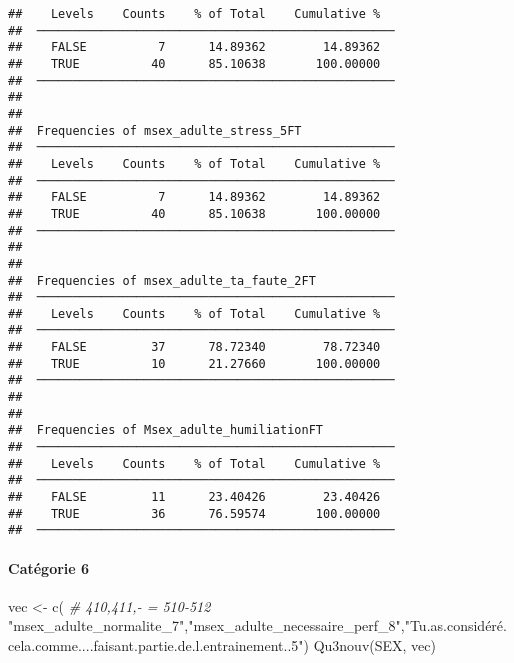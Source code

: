 \documentclass[
]{article}
\newenvironment{Shaded}{\begin{snugshade}}{\end{snugshade}}
\newcommand{\CommentTok}[1]{\textcolor[rgb]{0.56,0.35,0.01}{\textit{#1}}}
\newcommand{\FunctionTok}[1]{\textcolor[rgb]{0.00,0.00,0.00}{#1}}
\newcommand{\NormalTok}[1]{#1}
\newcommand{\OtherTok}[1]{\textcolor[rgb]{0.56,0.35,0.01}{#1}}
\newcommand{\StringTok}[1]{\textcolor[rgb]{0.31,0.60,0.02}{#1}}
\begin{document}
\begin{verbatim}
##    Levels    Counts    % of Total    Cumulative %   
##  ────────────────────────────────────────────────── 
##    FALSE          7      14.89362        14.89362   
##    TRUE          40      85.10638       100.00000   
##  ────────────────────────────────────────────────── 
## 
## 
##  Frequencies of msex_adulte_stress_5FT              
##  ────────────────────────────────────────────────── 
##    Levels    Counts    % of Total    Cumulative %   
##  ────────────────────────────────────────────────── 
##    FALSE          7      14.89362        14.89362   
##    TRUE          40      85.10638       100.00000   
##  ────────────────────────────────────────────────── 
## 
## 
##  Frequencies of msex_adulte_ta_faute_2FT            
##  ────────────────────────────────────────────────── 
##    Levels    Counts    % of Total    Cumulative %   
##  ────────────────────────────────────────────────── 
##    FALSE         37      78.72340        78.72340   
##    TRUE          10      21.27660       100.00000   
##  ────────────────────────────────────────────────── 
## 
## 
##  Frequencies of Msex_adulte_humiliationFT           
##  ────────────────────────────────────────────────── 
##    Levels    Counts    % of Total    Cumulative %   
##  ────────────────────────────────────────────────── 
##    FALSE         11      23.40426        23.40426   
##    TRUE          36      76.59574       100.00000   
##  ──────────────────────────────────────────────────
\end{verbatim}

\hypertarget{catuxe9gorie-6-1}{%
\paragraph{Catégorie 6}\label{catuxe9gorie-6-1}}

\begin{Shaded}
\begin{Highlighting}[]
\NormalTok{vec }\OtherTok{\textless{}{-}} \FunctionTok{c}\NormalTok{(                                                             }\CommentTok{\# 410,411,{-} = 510{-}512}
  \StringTok{"msex\_adulte\_normalite\_7"}\NormalTok{,}\StringTok{"msex\_adulte\_necessaire\_perf\_8"}\NormalTok{,}\StringTok{"Tu.as.considéré.cela.comme....faisant.partie.de.l.entrainement..5"}\NormalTok{)}
\FunctionTok{Qu3nouv}\NormalTok{(SEX, vec)}
\end{Highlighting}
\end{Shaded}
\end{document}
